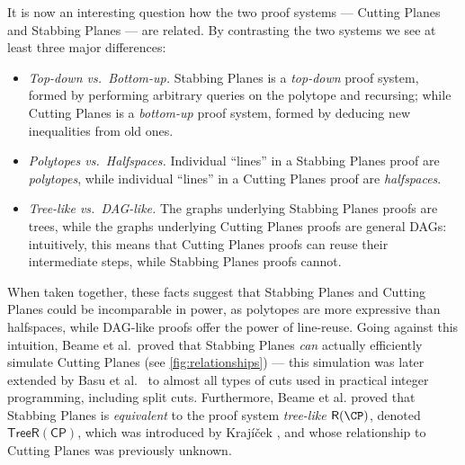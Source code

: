 \documentclass[11pt]{article}
\numberwithin{equation}{section}
\theoremstyle{definition}
\theoremstyle{plain}
\newcommand{\tRCP}{\ensuremath{\mathsf{TreeR(CP)}}}
\begin{document}
It is now an interesting question how the two proof systems --- Cutting Planes and Stabbing Planes --- are related.
By contrasting the two systems we see at least three major differences:
\begin{itemize}
\item \emph{Top-down vs.~Bottom-up.} Stabbing Planes is a \emph{top-down} proof system, formed by performing arbitrary queries on the polytope and recursing; while Cutting Planes is a \emph{bottom-up} proof system, formed by deducing new inequalities from old ones.  
%
%
%
%
%
%
%
	\item \emph{Polytopes vs.~Halfspaces.} Individual ``lines'' in a Stabbing Planes proof are \emph{polytopes}, while individual ``lines'' in a Cutting Planes proof are \emph{halfspaces}.  
	\item \emph{Tree-like vs.~DAG-like.} The graphs underlying Stabbing Planes proofs are trees, while the graphs underlying Cutting Planes proofs are general DAGs: intuitively, this means that Cutting Planes proofs can %
reuse  %
their intermediate steps, while Stabbing Planes proofs cannot.
\end{itemize}
When taken together, these facts suggest that Stabbing Planes and Cutting Planes could be incomparable in power, as polytopes are more expressive than halfspaces, while DAG-like proofs offer the power of line-reuse.
Going against this intuition, Beame et al.~proved that Stabbing Planes \emph{can} actually efficiently simulate Cutting Planes \cite{BeameFIKPPR18} (see \autoref{fig:relationships}) --- this simulation was later extended by Basu et al.~\cite{BasuCDJ21} to almost all types of cuts used in practical integer programming, including split cuts.
Furthermore, Beame et al. proved that Stabbing Planes is \emph{equivalent} to the proof system \emph{tree-like $\mathsf{R}(\CP)$}, denoted $\tRCP$, which was introduced by Kraj\'{i}\v{c}ek \cite{Krajicek98}, and whose relationship to Cutting Planes was previously unknown.
\end{document}
